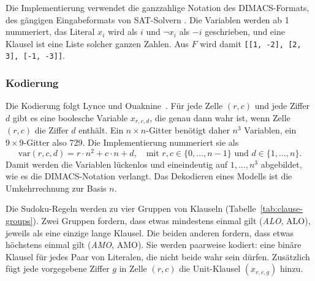 Die Implementierung verwendet die ganzzahlige Notation des DIMACS-Formats, des gängigen Eingabeformats von \acs{SAT}-Solvern .
Die Variablen werden ab 1 nummeriert, das Literal $x_i$ wird als $i$ und $\neg x_i$ als $-i$ geschrieben, und eine Klausel ist eine Liste solcher ganzen Zahlen.
Aus $F$ wird damit \texttt{[[1, -2], [2, 3], [-1, -3]]}.

\subsubsection{Kodierung} \label{sec:encoding}

Die Kodierung folgt Lynce und Ouaknine~\parencite*[3\psqq]{lynce2006}.
Für jede Zelle $(r, c)$ und jede Ziffer $d$ gibt es eine boolesche Variable $x_{r,c,d}$, die genau dann wahr ist, wenn Zelle $(r, c)$ die Ziffer $d$ enthält.
Ein $n \times n$-Gitter benötigt daher $n^3$ Variablen, ein $9 \times 9$-Gitter also 729.
Die Implementierung nummeriert sie als
\[
    \mathrm{var}(r, c, d) = r \cdot n^2 + c \cdot n + d,
    \quad \text{mit } r, c \in \{0, \dots, n-1\} \text{ und } d \in \{1, \dots, n\}.
\]
Damit werden die Variablen lückenlos und eineindeutig auf $1, \dots, n^3$ abgebildet, wie es die DIMACS-Notation verlangt.
Das Dekodieren eines Modells ist die Umkehrrechnung zur Basis $n$.

Die Sudoku-Regeln werden zu vier Gruppen von Klauseln (Tabelle~\ref{tab:clause-groups}).
Zwei Gruppen fordern, dass etwas mindestens einmal gilt (\emph{\acl{ALO}}, \acs{ALO}), jeweils als eine einzige lange Klausel.
Die beiden anderen fordern, dass etwas höchstens einmal gilt (\emph{\acl{AMO}}, \acs{AMO}).
Sie werden paarweise kodiert: eine binäre Klausel für jedes Paar von Literalen, die nicht beide wahr sein dürfen.
Zusätzlich fügt jede vorgegebene Ziffer $g$ in Zelle $(r, c)$ die Unit-Klausel $(x_{r,c,g})$ hinzu.

